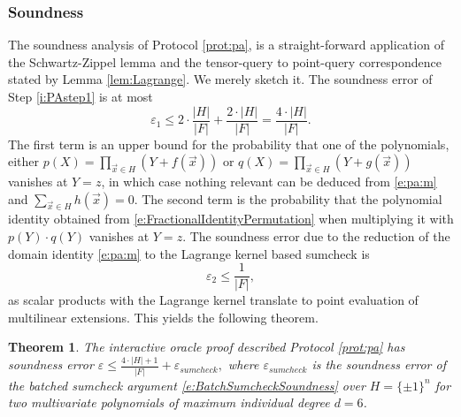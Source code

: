 \documentclass[11pt]{article}
\newtheorem{thm}{Theorem}[]
\theoremstyle{definition}
\theoremstyle{remark}
\begin{document}
\subsubsection{Soundness}
\label{s:PASoundness}

The soundness analysis of Protocol \ref{prot:pa}, is a straight-forward application of the Schwartz-Zippel lemma and the tensor-query to point-query correspondence stated by Lemma \ref{lem:Lagrange}.
We merely sketch it.
The soundness error of Step \ref{i:PAstep1} is at most 
\begin{equation*}
\varepsilon_1 \leq 2\cdot\frac{ |H|}{|F|} + \frac{2\cdot |H|}{|F|} = \frac{4\cdot |H|}{|F|}.
\end{equation*}
The first term is an upper bound for the probability that one of the polynomials, either
$p(X)=\prod_{\vec x\in H} (Y + f(\vec x))$ 
or 
$q(X)= \prod_{\vec x\in H} (Y + g(\vec x))$ 
vanishes at $Y=z$, in which case nothing relevant can be deduced from \eqref{e:pa:m} and $\sum_{\vec x\in H} h(\vec x)=0$.
The second term is the probability that the polynomial identity obtained from \eqref{e:FractionalIdentityPermutation} when multiplying it with $p(Y)\cdot q(Y)$ vanishes at $Y = z$.
The soundness error due to the reduction of the domain identity  \eqref{e:pa:m}  to the Lagrange kernel based sumcheck is 
\[
\varepsilon_2 \leq \frac{1}{|F|},
\]
as scalar products with the Lagrange kernel translate to point evaluation of multilinear extensions.
This yields the following theorem. 

\begin{thm}
\label{thm:PA:soundness}
 The interactive oracle proof described Protocol \ref{prot:pa} has soundness error
$
\varepsilon \leq \frac{4\cdot |H| + 1}{|F|} + \varepsilon_{sumcheck},
$
where $\varepsilon_{sumcheck}$ is the soundness error of the batched sumcheck argument \eqref{e:BatchSumcheckSoundness} over $H=\{\pm 1\}^n$ for two multivariate polynomials of maximum individual degree $d=6$.
\end{thm}
\end{document}
